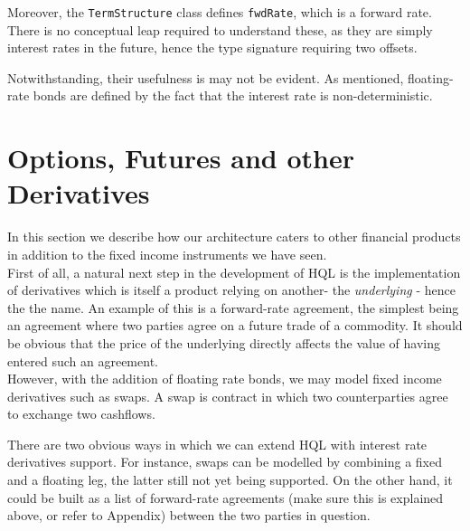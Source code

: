 Moreover, the \texttt{TermStructure} class defines \texttt{fwdRate}, which
is a forward rate. There is no conceptual leap required to understand these,
as they are simply interest rates in the future, hence the type signature
requiring two offsets.

Notwithstanding, their usefulness is may not be evident. As mentioned, 
floating-rate bonds are defined by the fact that the interest rate is
non-deterministic. 


\section{Options, Futures and other Derivatives}

In this section we describe how our architecture caters to other financial 
products in addition to the fixed income instruments we have seen.\\

First of all, a natural next step in the development of HQL is the 
implementation of derivatives which is itself a product relying on another- the 
\emph{underlying} - hence the the name. An example of this is 
a forward-rate agreement, the simplest being an agreement where two parties 
agree on a future trade of a commodity. It should be obvious that the price of 
the underlying directly affects the value of having entered such an agreement.\\

However, with the addition of floating rate bonds, we may model fixed income 
derivatives such as swaps. A swap is contract in which two counterparties agree 
to exchange two cashflows.


There are two obvious ways in which we can extend HQL with interest rate 
derivatives support. For instance, swaps can be modelled by combining a fixed 
and a floating leg, the latter still not yet being supported. On the other 
hand, it could be built as a list of forward-rate agreements (make sure this is 
explained above, or refer to Appendix) between the two parties in question.
